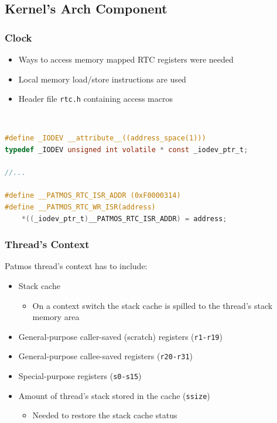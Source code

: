 \documentclass[notheorems]{beamer}
\begin{document}
\subsection{Kernel's Arch Component}
\begin{frame}[fragile]
\frametitle{Clock}
\begin{itemize}
	\item Ways to access memory mapped RTC registers were needed
	\item Local memory load/store instructions are used
	\item Header file \texttt{rtc.h} containing access macros
\end{itemize}

\hspace{0.5cm}~\begin{minipage}[c]{.9\textwidth}
\begin{lstlisting}[language=C, width=.9\textwidth, caption=\texttt{rtc.h} header file]
#define _IODEV __attribute__((address_space(1)))
typedef _IODEV unsigned int volatile * const _iodev_ptr_t;

//...

#define __PATMOS_RTC_ISR_ADDR (0xF0000314)
#define __PATMOS_RTC_WR_ISR(address) 
    *((_iodev_ptr_t)__PATMOS_RTC_ISR_ADDR) = address;
\end{lstlisting}
\end{minipage}
\end{frame}

\begin{frame}
\frametitle{Thread's Context}
Patmos thread's context has to include:
\begin{itemize}
	\item Stack cache
		\begin{itemize}
			\item On a context switch the stack cache is spilled to the thread's stack memory area
		\end{itemize}
	\item General-purpose caller-saved (scratch) registers (\texttt{r1-r19})
	\item General-purpose callee-saved registers (\texttt{r20-r31})
	\item Special-purpose registers (\texttt{s0-s15})
	\item Amount of thread's stack stored in the cache (\texttt{ssize})
		\begin{itemize}
			\item Needed to restore the stack cache status
		\end{itemize}
\end{itemize}
\end{frame}
\end{document}
